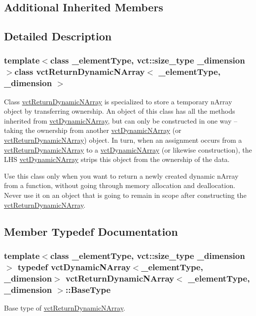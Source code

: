 \subsection*{Additional Inherited Members}


\subsection{Detailed Description}
\subsubsection*{template$<$class \+\_\+element\+Type, vct\+::size\+\_\+type \+\_\+dimension$>$class vct\+Return\+Dynamic\+N\+Array$<$ \+\_\+element\+Type, \+\_\+dimension $>$}

Class \hyperlink{classvct_return_dynamic_n_array}{vct\+Return\+Dynamic\+N\+Array} is specialized to store a temporary n\+Array object by transferring ownership. An object of this class has all the methods inherited from \hyperlink{classvct_dynamic_n_array}{vct\+Dynamic\+N\+Array}, but can only be constructed in one way -- taking the ownership from another \hyperlink{classvct_dynamic_n_array}{vct\+Dynamic\+N\+Array} (or \hyperlink{classvct_return_dynamic_n_array}{vct\+Return\+Dynamic\+N\+Array}) object. In turn, when an assignment occurs from a \hyperlink{classvct_return_dynamic_n_array}{vct\+Return\+Dynamic\+N\+Array} to a \hyperlink{classvct_dynamic_n_array}{vct\+Dynamic\+N\+Array} (or likewise construction), the L\+H\+S \hyperlink{classvct_dynamic_n_array}{vct\+Dynamic\+N\+Array} strips this object from the ownership of the data.

Use this class only when you want to return a newly created dynamic n\+Array from a function, without going through memory allocation and deallocation. Never use it on an object that is going to remain in scope after constructing the \hyperlink{classvct_return_dynamic_n_array}{vct\+Return\+Dynamic\+N\+Array}. 

\subsection{Member Typedef Documentation}
\hypertarget{classvct_return_dynamic_n_array_a35849019078c617ed43b530c49f0cfe8}{}
\subsubsection[{Base\+Type}]{\setlength{\rightskip}{0pt plus 5cm}template$<$class \+\_\+element\+Type, vct\+::size\+\_\+type \+\_\+dimension$>$ typedef {\bf vct\+Dynamic\+N\+Array}$<$\+\_\+element\+Type, \+\_\+dimension$>$ {\bf vct\+Return\+Dynamic\+N\+Array}$<$ \+\_\+element\+Type, \+\_\+dimension $>$\+::{\bf Base\+Type}}\label{classvct_return_dynamic_n_array_a35849019078c617ed43b530c49f0cfe8}
Base type of \hyperlink{classvct_return_dynamic_n_array}{vct\+Return\+Dynamic\+N\+Array}. 

